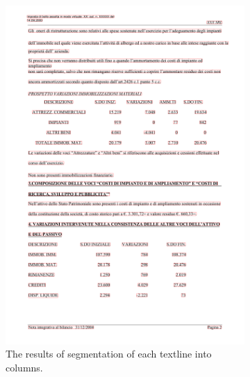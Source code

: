 \begin{figure}[p]
\begin{subfigure}{0.45\textwidth}
\includegraphics[width=\linewidth]{img/implementation/implem3.png}
\caption{The results of segmentation of each textline into columns.}
\label{fig:implem3}
\end{subfigure}
\qquad
\begin{subfigure}{0.45\textwidth}

\end{subfigure}
\end{figure}
